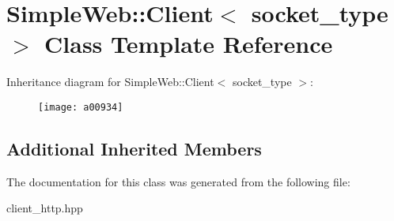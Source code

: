 \hypertarget{a00934}{}\section{Simple\+Web\+:\+:Client$<$ socket\+\_\+type $>$ Class Template Reference}
\label{a00934}
Inheritance diagram for Simple\+Web\+:\+:Client$<$ socket\+\_\+type $>$\+:\begin{figure}[H]
\begin{center}
\leavevmode
\texttt{[image: a00934]}
\end{center}
\end{figure}
\subsection*{Additional Inherited Members}


The documentation for this class was generated from the following file\+:\begin{DoxyCompactItemize}
\item 
client\+\_\+http.\+hpp\end{DoxyCompactItemize}
